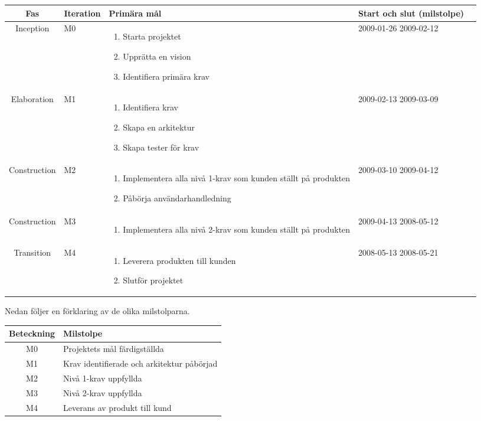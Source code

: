 \begin{center}
	\begin{tabular}{| c | m{1.5cm} | m{5cm} | m{2.5cm} | m{2cm} |}
		\hline
		\textbf{Fas} & \textbf{Iteration} & \textbf{Primära mål} & \textbf{Start och slut (milstolpe)} \\
		\hline
		Inception & M0 & \begin{enumerate} \item Starta projektet \item Upprätta en vision \item Identifiera primära krav \end{enumerate} & 2009-01-26 2009-02-12 \\
		\hline
		Elaboration & M1 & \begin{enumerate} \item Identifiera krav \item Skapa en arkitektur \item Skapa tester för krav \end{enumerate} & 2009-02-13 2009-03-09 \\
		\hline
		Construction & M2 & \begin{enumerate} \item Implementera alla nivå 1-krav som kunden ställt på produkten \item Påbörja användarhandledning\end{enumerate} & 2009-03-10 2009-04-12 \\
		\hline
		Construction & M3 & \begin{enumerate} \item Implementera alla nivå 2-krav som kunden ställt på produkten \end{enumerate} & 2009-04-13 2008-05-12 \\
		\hline
		Transition & M4 & \begin{enumerate} \item Leverera produkten till kunden \item Slutför projektet \end{enumerate} & 2008-05-13 2008-05-21 \\
		\hline
	\end{tabular}
\end{center}

\emph{ }\linebreak
Nedan följer en förklaring av de olika milstolparna.

\begin{center}
	\begin{tabular}{| c | l |}
		\hline
		Beteckning & Milstolpe \\
		\hline
		M0 & Projektets mål färdigställda \\
		\hline
		M1 & Krav identifierade och arkitektur påbörjad \\
		\hline
		M2 & Nivå 1-krav uppfyllda \\
		\hline
		M3 & Nivå 2-krav uppfyllda \\
		\hline
		M4 & Leverans av produkt till kund \\
		\hline
	\end{tabular}
\end{center}

